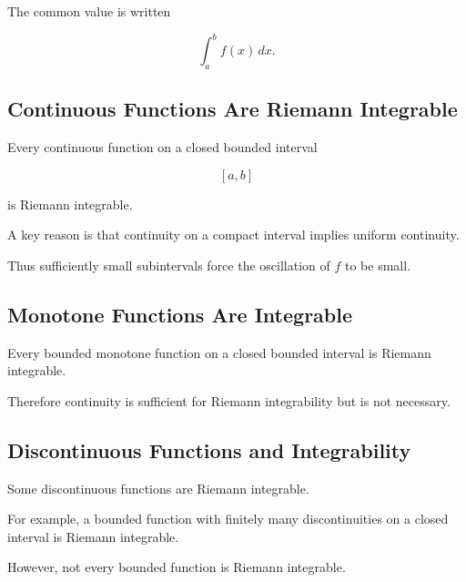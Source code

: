 The common value is written

\[
\boxed{
\int_a^b f(x)\,dx.
}
\]

\subsection{Continuous Functions Are Riemann Integrable}
\label{subsec:continuous-riemann-integrable}

\begin{theorem}
Every continuous function on a closed bounded interval

\[
[a,b]
\]

is Riemann integrable.
\end{theorem}

A key reason is that continuity on a compact interval implies uniform
continuity.

Thus sufficiently small subintervals force the oscillation of \(f\) to be
small.

\subsection{Monotone Functions Are Integrable}
\label{subsec:monotone-riemann-integrable}

\begin{theorem}
Every bounded monotone function on a closed bounded interval is Riemann
integrable.
\end{theorem}

Therefore continuity is sufficient for Riemann integrability but is not
necessary.

\subsection{Discontinuous Functions and Integrability}
\label{subsec:discontinuous-riemann-functions}

Some discontinuous functions are Riemann integrable.

For example, a bounded function with finitely many discontinuities on a
closed interval is Riemann integrable.

However, not every bounded function is Riemann integrable.

